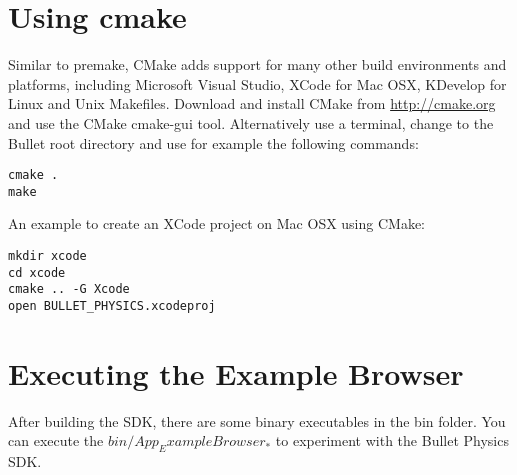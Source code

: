 \section{Using cmake}
Similar to premake, CMake adds support for many other build environments and platforms, including Microsoft Visual Studio, XCode for Mac OSX, KDevelop for Linux and Unix Makefiles. Download and install CMake from \url{http://cmake.org} and use the CMake cmake-gui tool. Alternatively use a terminal, change to the Bullet root directory and use for example the following commands:

\begin{lstlisting}[caption=CMake to GNU Makefile, label=cmake_make]
cmake . 
make
\end{lstlisting}
An example to create an XCode project on Mac OSX using CMake:
\begin{lstlisting}[caption=CMake to Xcode, label=cmake_xcode]
mkdir xcode
cd xcode
cmake .. -G Xcode
open BULLET_PHYSICS.xcodeproj
\end{lstlisting}


\section{Executing the Example Browser}
After building the SDK, there are some binary executables in the bin folder. You can execute the $bin/App_ExampleBrowser_*$ to experiment with the Bullet Physics SDK.